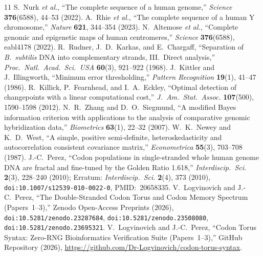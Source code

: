 \documentclass[11pt,a4paper]{article}
\begin{document}
\begin{thebibliography}{11}
S.~Nurk \textit{et al.}, ``The complete sequence of a human genome,'' \textit{Science} \textbf{376}(6588), 44--53 (2022).
A.~Rhie \textit{et al.}, ``The complete sequence of a human Y chromosome,'' \textit{Nature} \textbf{621}, 344--354 (2023).
N.~Altemose \textit{et al.}, ``Complete genomic and epigenetic maps of human centromeres,'' \textit{Science} \textbf{376}(6588), eabl4178 (2022).
R.~Rudner, J.~D.~Karkas, and E.~Chargaff, ``Separation of \textit{B.~subtilis} DNA into complementary strands, III.\ Direct analysis,'' \textit{Proc.\ Natl.\ Acad.\ Sci.\ USA} \textbf{60}(3), 921--922 (1968).
J.~Kittler and J.~Illingworth, ``Minimum error thresholding,'' \textit{Pattern Recognition} \textbf{19}(1), 41--47 (1986).
R.~Killick, P.~Fearnhead, and I.~A.~Eckley, ``Optimal detection of changepoints with a linear computational cost,'' \textit{J.\ Am.\ Stat.\ Assoc.} \textbf{107}(500), 1590--1598 (2012).
N.~R.~Zhang and D.~O.~Siegmund, ``A modified Bayes information criterion with applications to the analysis of comparative genomic hybridization data,'' \textit{Biometrics} \textbf{63}(1), 22--32 (2007).
W.~K.~Newey and K.~D.~West, ``A simple, positive semi-definite, heteroskedasticity and autocorrelation consistent covariance matrix,'' \textit{Econometrica} \textbf{55}(3), 703--708 (1987).
J.-C.~Perez, ``Codon populations in single-stranded whole human genome DNA are fractal and fine-tuned by the Golden Ratio 1.618,'' \textit{Interdiscip.\ Sci.} \textbf{2}(3), 228--240 (2010); Erratum: \textit{Interdiscip.\ Sci.} \textbf{2}(4), 373 (2010), \texttt{doi:10.1007/s12539-010-0022-0}, PMID:~20658335.
V.~Logvinovich and J.-C.~Perez, ``The Double-Stranded Codon Torus and Codon Memory Spectrum (Papers~1--3),'' Zenodo Open-Access Preprints (2026), \texttt{doi:10.5281/zenodo.23287684}, \texttt{doi:10.5281/zenodo.23508080}, \texttt{doi:10.5281/zenodo.23695321}.
V.~Logvinovich and J.-C.~Perez, ``Codon Torus Syntax: Zero-RNG Bioinformatics Verification Suite (Papers~1--3),'' GitHub Repository (2026), \url{https://github.com/Dr-Logvinovich/codon-torus-syntax}.
\end{thebibliography}
\end{document}
